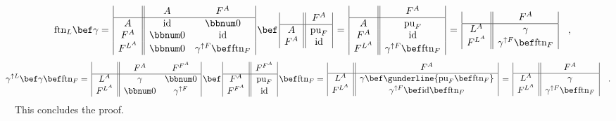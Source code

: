 \begin{align*}
 & \text{ftn}_{L}\bef\gamma=\,\begin{array}{|c||cc|}
 & A & F^{A}\\
\hline A & \text{id} & \bbnum 0\\
F^{A} & \bbnum 0 & \text{id}\\
F^{L^{A}} & \bbnum 0 & \gamma^{\uparrow F}\bef\text{ftn}_{F}
\end{array}\,\bef\,\begin{array}{|c||c|}
 & F^{A}\\
\hline A & \text{pu}_{F}\\
F^{A} & \text{id}
\end{array}\,=\,\begin{array}{|c||c|}
 & F^{A}\\
\hline A & \text{pu}_{F}\\
F^{A} & \text{id}\\
F^{L^{A}} & \gamma^{\uparrow F}\bef\text{ftn}_{F}
\end{array}\,=\,\begin{array}{|c||c|}
 & F^{A}\\
\hline L^{A} & \gamma\\
F^{L^{A}} & \gamma^{\uparrow F}\bef\text{ftn}_{F}
\end{array}\quad,
\end{align*}
\begin{align*}
 & \negthickspace\negthickspace\negthickspace\negthickspace\gamma^{\uparrow L}\bef\gamma\bef\text{ftn}_{F}=\,\begin{array}{|c||cc|}
 & F^{A} & F^{F^{A}}\\
\hline L^{A} & \gamma & \bbnum 0\\
F^{L^{A}} & \bbnum 0 & \gamma^{\uparrow F}
\end{array}\,\bef\,\begin{array}{|c||c|}
 & F^{F^{A}}\\
\hline F^{A} & \text{pu}_{F}\\
F^{F^{A}} & \text{id}
\end{array}\,\bef\text{ftn}_{F}=\,\begin{array}{|c||c|}
 & F^{A}\\
\hline L^{A} & \gamma\bef\gunderline{\text{pu}_{F}\bef\text{ftn}_{F}}\\
F^{L^{A}} & \gamma^{\uparrow F}\bef\text{id}\bef\text{ftn}_{F}
\end{array}\,=\,\begin{array}{|c||c|}
 & F^{A}\\
\hline L^{A} & \gamma\\
F^{L^{A}} & \gamma^{\uparrow F}\bef\text{ftn}_{F}
\end{array}\quad.
\end{align*}
This concludes the proof.

